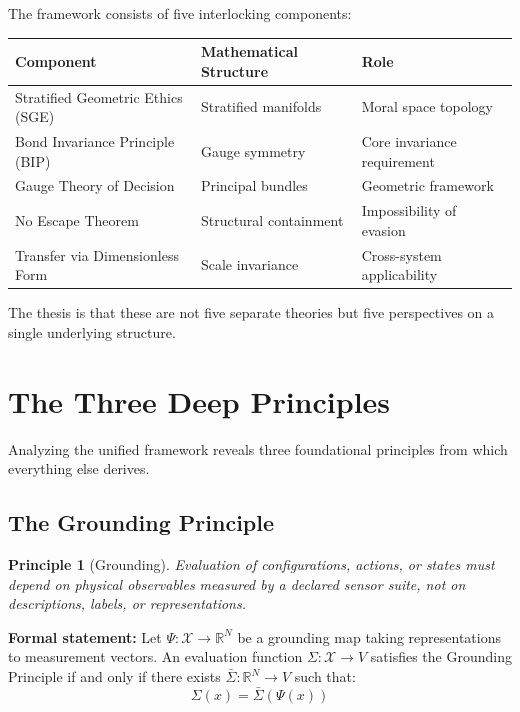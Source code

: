 \documentclass[12pt]{article}
\newtheorem{principle}{Principle}
\begin{document}
The framework consists of five interlocking components:

\begin{table}[h]
\centering
\begin{tabular}{lll}
\toprule
\textbf{Component} & \textbf{Mathematical Structure} & \textbf{Role} \\
\midrule
Stratified Geometric Ethics (SGE) & Stratified manifolds & Moral space topology \\
Bond Invariance Principle (BIP) & Gauge symmetry & Core invariance requirement \\
Gauge Theory of Decision & Principal bundles & Geometric framework \\
No Escape Theorem & Structural containment & Impossibility of evasion \\
Transfer via Dimensionless Form & Scale invariance & Cross-system applicability \\
\bottomrule
\end{tabular}
\end{table}

The thesis is that these are not five separate theories but five perspectives on a single underlying structure.

\section{The Three Deep Principles}

Analyzing the unified framework reveals three foundational principles from which everything else derives.

\subsection{The Grounding Principle}

\begin{principle}[Grounding]
\textit{Evaluation of configurations, actions, or states must depend on physical observables measured by a declared sensor suite, not on descriptions, labels, or representations.}
\end{principle}

\textbf{Formal statement:} Let $\Psi : \mathcal{X} \to \mathbb{R}^N$ be a grounding map taking representations to measurement vectors. An evaluation function $\Sigma : \mathcal{X} \to V$ satisfies the Grounding Principle if and only if there exists $\bar{\Sigma} : \mathbb{R}^N \to V$ such that:
\[
\Sigma(x) = \bar{\Sigma}(\Psi(x))
\]
\end{document}
